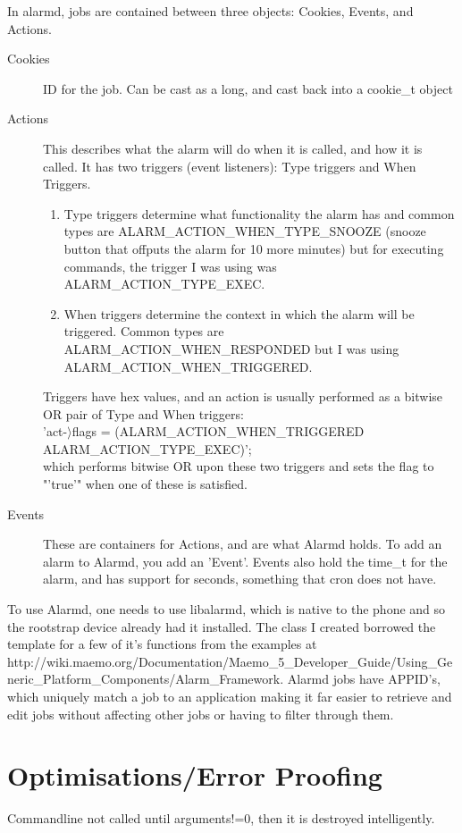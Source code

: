 In alarmd, jobs are contained between three objects: Cookies, Events, and Actions.
\begin{description}
  \item[Cookies] ID for the job. Can be cast as a long, and cast back into a cookie\_t object
  \item[Actions] This describes what the alarm will do when it is called, and how it is called. It has two triggers (event listeners): Type triggers and When Triggers.
\begin{enumerate}
\item Type triggers determine what functionality the alarm has and common types are ALARM\_ACTION\_WHEN\_TYPE\_SNOOZE (snooze button that offputs the alarm for 10 more minutes) but for executing commands, the trigger I was using was ALARM\_ACTION\_TYPE\_EXEC. 
\item When triggers determine the context in which the alarm will be triggered. Common types are ALARM\_ACTION\_WHEN\_RESPONDED but I was using ALARM\_ACTION\_WHEN\_TRIGGERED.
\end{enumerate}
Triggers have hex values, and an action is usually performed as a bitwise OR pair of Type and When triggers:\\
'act-\(\rangle\)flags \textbar= (ALARM\_ACTION\_WHEN\_TRIGGERED \textbar ALARM\_ACTION\_TYPE\_EXEC)';\\
which performs bitwise OR upon these two triggers and sets the flag to "'true'" when one of these is satisfied.
 \item[Events] These are containers for Actions, and are what Alarmd holds. To add an alarm to Alarmd, you add an 'Event'. Events also hold the time\_t for the alarm, and has support for  seconds, something that cron does not have.
\end{description}

To use Alarmd, one needs to use libalarmd, which is native to the phone and so the rootstrap device already had it installed. The class I created borrowed the template for a few of it's functions from the examples at http://wiki.maemo.org/Documentation/Maemo\_5\_Developer\_Guide/Using\_Generic\_Platform\_Components/Alarm\_Framework. 
Alarmd jobs have APPID's, which uniquely match a job to an application making it far easier to retrieve and edit jobs without affecting other jobs or having to filter through them.

\section{Optimisations/Error Proofing}
Commandline not called until arguments!=0, then it is destroyed intelligently.


